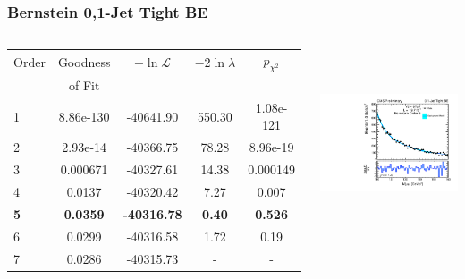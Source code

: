 \documentclass{beamer}
\begin{document}
\begin{frame}
\frametitle{Bernstein 0,1-Jet Tight BE}
  \begin{columns}[c]
   \column{60mm}
      \begin{center}
      \tiny
\begin{tabular}{|l|c|c|c|c|} \hline
Order & Goodness & $-\ln\mathcal{L}$ & $-2\ln\lambda$ & $p_{\chi^2}$ \\ 
 & of Fit  &  & &  \\ \hline \hline
1 & 8.86e-130 & -40641.90 & 550.30 & 1.08e-121  \\ \hline
2 & 2.93e-14 & -40366.75 & 78.28 & 8.96e-19  \\ \hline
3 & 0.000671 & -40327.61 & 14.38 & 0.000149  \\ \hline
4 & 0.0137 & -40320.42 & 7.27 & 0.007  \\ \hline
\bf 5 & \bf 0.0359 & \bf -40316.78 & \bf 0.40 & \bf 0.526  \\ \hline
6 & 0.0299 & -40316.58 & 1.72 & 0.19  \\ \hline
7 & 0.0286 & -40315.73 & - & -  \\ \hline
\end{tabular}
\\
\normalsize
\vspace{2em}
\bf
      \end{center}
   \column{60mm}
      \begin{center}
        \includegraphics[height=55mm]{wholeRangeHggStudy1/plotsOrderStudyPolysHighOrders/order_Shape_Jets01PassPtG10BE_Bernstein5}
      \end{center}
  \end{columns}
  \begin{center}
  \end{center}
\end{frame}
\end{document}
